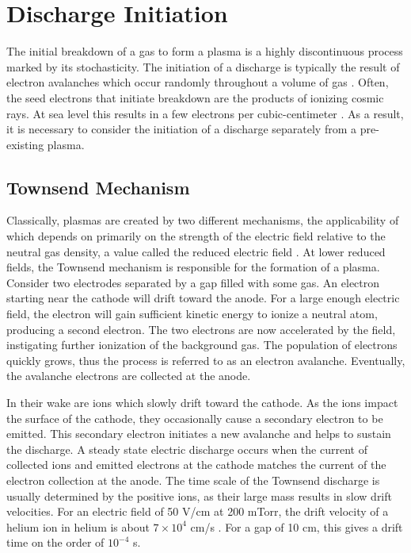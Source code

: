 \section{Discharge Initiation}

The initial breakdown of a gas to form a plasma is a highly discontinuous
process marked by its stochasticity. The initiation of a discharge is typically
the result of electron avalanches which occur randomly throughout a volume of
gas \cite{Druyvesteyn1940}. Often, the seed electrons that initiate breakdown
are the products of ionizing cosmic rays. At sea level this results in a few
electrons per cubic-centimeter \cite{Druyvesteyn1940}. As a result, it is
necessary to consider the initiation of a discharge separately from a
pre-existing plasma.

\subsection{Townsend Mechanism}

Classically, plasmas are created by two different mechanisms, the applicability
of which depends on primarily on the strength of the electric field relative to
the neutral gas density, a value called the reduced electric field
\cite{Huxley1966}. At lower reduced fields, the Townsend mechanism is
responsible for the formation of a plasma. Consider two electrodes separated by
a gap filled with some gas. An electron starting near the cathode will drift
toward the anode. For a large enough electric field, the electron will gain
sufficient kinetic energy to ionize a neutral atom, producing a second electron.
The two electrons are now accelerated by the field, instigating further
ionization of the background gas. The population of electrons quickly grows,
thus the process is referred to as an electron avalanche. Eventually, the
avalanche electrons are collected at the anode.

In their wake are ions which slowly drift toward the cathode. As the ions impact
the surface of the cathode, they occasionally cause a secondary electron to be
emitted. This secondary electron initiates a new avalanche and helps to sustain
the discharge. A steady state electric discharge occurs when the current of
collected ions and emitted electrons at the cathode matches the current of the
electron collection at the anode. The time scale of the Townsend discharge is
usually determined by the positive ions, as their large mass results in slow
drift velocities. For an electric field of 50 V/cm at 200 mTorr, the drift
velocity of a helium ion in helium is about $7\times10^4$ cm/s
\cite{Hornbeck1951}. For a gap of 10 cm, this gives a drift time on the order of
$10^{-4}$ s.

